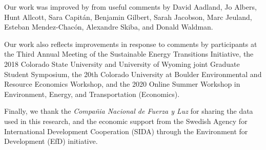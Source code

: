 Our work was improved by from useful comments by David Aadland, Jo Albers, Hunt Allcott, Sara Capitán, Benjamin Gilbert, Sarah Jacobson, Marc Jeuland, Esteban Mendez-Chacón, Alexandre Skiba, and Donald Waldman.

Our work also reflects improvements in response to comments by participants at the Third Annual Meeting of the Sustainable Energy Transitions Initiative, the 2018 Colorado State University and University of Wyoming joint Graduate Student Symposium, the 20th Colorado University at Boulder Environmental and Resource Economics Workshop, and the 2020 Online Summer Workshop in Environment, Energy, and Transportation (Economics).

Finally, we thank the \emph{Compañia Nacional de Fuerza y Luz} for sharing the data used in this research, and the economic support from the Swedish Agency for International Development Cooperation (SIDA) through the Environment for Development (EfD) initiative.
